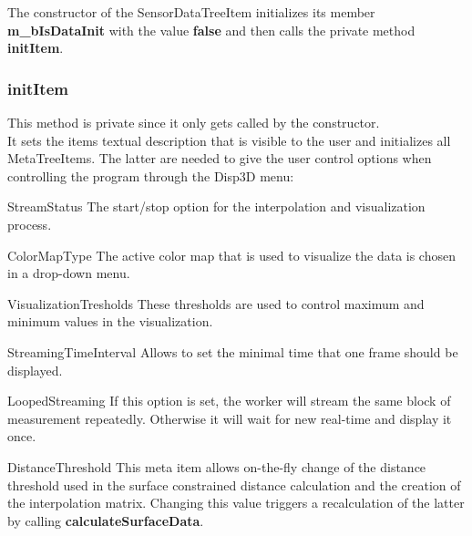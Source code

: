 The constructor of the SensorDataTreeItem initializes its member \textbf{m\_bIsDataInit} with the value \textbf{false} and then calls the private method \textbf{initItem}.

\subsubsection{initItem}

This method is private since it only gets called by the constructor.\\
It sets the items textual description that is visible to the user and initializes all MetaTreeItems. The latter are needed to give the user control options when controlling the program through the Disp3D menu:

\begin{aims}
	\item[\hspace*{11mm} StreamStatus] The start/stop option for the interpolation and visualization process.
\end{aims}

\begin{aims}
	\item[\hspace*{11mm} ColorMapType] The active color map that is used to visualize the data is chosen in a drop-down menu.
\end{aims}

\begin{aims}
	\item[\hspace*{11mm} VisualizationTresholds] These thresholds are used to control maximum and minimum values in the visualization.
\end{aims}

\begin{aims}
	\item[\hspace*{11mm} StreamingTimeInterval] Allows to set the minimal time that one frame should be displayed.
\end{aims}

\begin{aims}
	\item[\hspace*{11mm} LoopedStreaming] If this option is set, the worker will stream the same block of measurement repeatedly. Otherwise it will wait for new real-time and display it once.
\end{aims}

\begin{aims}
	\item[\hspace*{11mm} DistanceThreshold] This meta item allows on-the-fly change of the distance threshold used in the surface constrained distance calculation and the creation of the interpolation matrix. Changing this value triggers a recalculation of the latter by calling \textbf{calculateSurfaceData}.
\end{aims}

